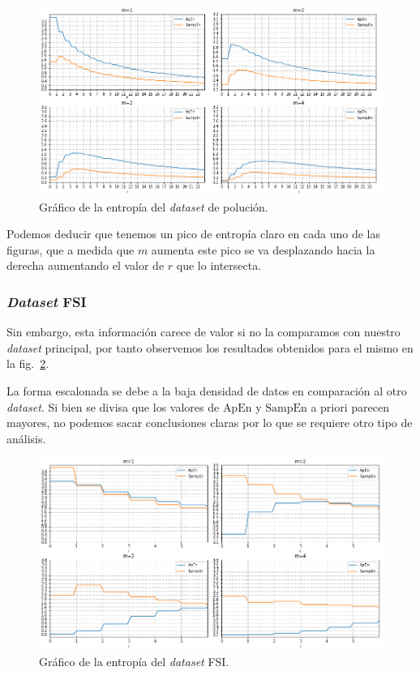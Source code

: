 \documentclass[a4paper,12pt]{article}
\begin{document}
\begin{figure}[H]
	\begin{center}
	\includegraphics[width=1\textwidth]{en_pollution.png}
  	\caption{Gráfico de la entropía del \textit{dataset} de polución.}
  	\label{fig:en_pol}
  	\end{center}
\end{figure}

Podemos deducir que tenemos un pico de entropía claro en cada uno de las figuras, que a medida que $m$ aumenta este pico se va desplazando hacia la derecha aumentando el valor de $r$ que lo intersecta.

\subsubsection{\textit{Dataset} FSI}
Sin embargo, esta información carece de valor si no la comparamos con nuestro \textit{dataset} principal, por tanto observemos los resultados obtenidos para el mismo en la fig.~\ref{fig:en_fsi}.

La forma escalonada se debe a la baja densidad de datos en comparación al otro \textit{dataset}. Si bien se divisa que los valores de $\textrm{ApEn}$ y $\textrm{SampEn}$ a priori parecen mayores, no podemos sacar conclusiones claras por lo que se requiere otro tipo de análisis.

\begin{figure}[H]
	\begin{center}
	\includegraphics[width=1\textwidth]{en_fsi.png}
  	\caption{Gráfico de la entropía del \textit{dataset} FSI.}
  	\label{fig:en_fsi}
  	\end{center}
\end{figure}
\end{document}
